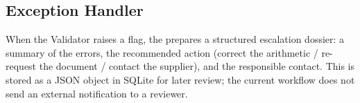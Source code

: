 \subsection{Exception Handler}

When the Validator raises a flag, the  prepares a
structured escalation dossier: a summary of the errors, the recommended action
(correct the arithmetic / re-request the document / contact the supplier), and
the responsible contact. This is stored as a JSON object in SQLite for later
review; the current workflow does not send an external notification to a reviewer.
